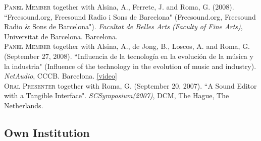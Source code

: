 \documentclass[10pt, a4paper]{article}
\newcommand{\years}[1]{\marginnote{\scriptsize #1}}
\begin{document}
\years{2008b} \textsc{Panel Member} together with Alsina, A., Ferrete, J. and Roma, G. (2008). “Freesound.org, Freesound Radio i Sons de Barcelona" (Freesound.org, Freesound Radio \& Sons de Barcelona"). \emph{Facultat de Belles Arts (Faculty of Fine Arts)}, Universitat de Barcelona. Barcelona.\\
\years{2008a} \textsc{Panel Member} together with Alsina, A., de Jong, B., Loscos, A. and Roma, G. (September 27, 2008). “Influencia de la tecnología en la evolución de la música y la industria" (Influence of the technology in the evolution of music and industry). \emph{NetAudio}, CCCB. Barcelona. \href{https://www.youtube.com/watch?v=6JlCCvYXrHY}{[video]}\\
\years{2007}\textsc{Oral Presenter} together with Roma, G. (September 20, 2007). “A Sound Editor with a Tangible Interface". \emph{SCSymposium(2007)}, DCM, The Hague, The Netherlands.

\subsection*{Own Institution}
\noindent
\end{document}
